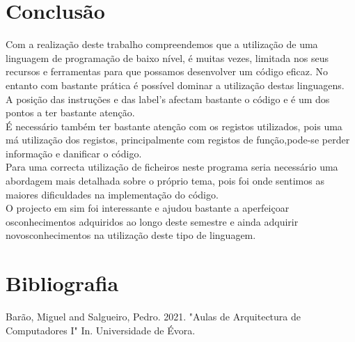\documentclass[letterpaper,12pt]{article}
\begin{document}
\section{Conclusão}
Com a realização deste trabalho compreendemos que a utilização de uma linguagem de programação de baixo nível, é muitas vezes, limitada nos seus recursos e ferramentas para que possamos desenvolver um código eficaz. No entanto com bastante prática é possível dominar a utilização destas linguagens.\\
A posição das instruções e das label's afectam bastante o código e é um dos pontos a ter bastante atenção.\\
É necessário também ter bastante atenção com os registos utilizados, pois uma má utilização dos registos, principalmente com registos de função,\newline pode-se perder informação e danificar o código.\\
Para uma correcta utilização de ficheiros neste programa seria necessário uma abordagem mais detalhada sobre o próprio tema, pois foi onde sentimos as maiores dificuldades na implementação do código.\\
O projecto em sim foi interessante e ajudou bastante a aperfeiçoar os\newline conhecimentos adquiridos ao longo deste semestre e ainda adquirir novos\newline conhecimentos na utilização deste tipo de linguagem. 


\section{Bibliografia}
Barão, Miguel and Salgueiro, Pedro. 2021. "Aulas de Arquitectura de Computadores I" In. Universidade de Évora.\\
\end{document}
